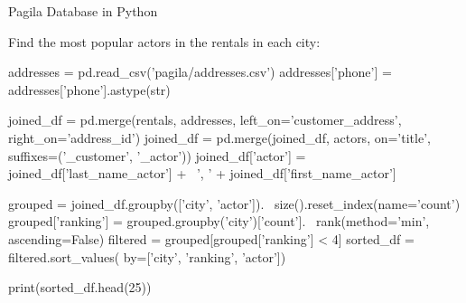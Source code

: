 \documentclass[ignorenonframetext,xcolor=x11names]{beamer}
\begin{document}
\begin{frame}[fragile]{Pagila Database in Python}

Find the most popular actors in the rentals in each city:

\scriptsize
\begin{pythoncode}
addresses = pd.read_csv('pagila/addresses.csv')
addresses['phone'] = addresses['phone'].astype(str)

joined_df = pd.merge(rentals, addresses, 
                     left_on='customer_address', 
                     right_on='address_id')
joined_df = pd.merge(joined_df, actors, 
                     on='title', 
                     suffixes=('_customer', '_actor'))
joined_df['actor'] = joined_df['last_name_actor'] + \
              ', ' + joined_df['first_name_actor']

grouped = joined_df.groupby(['city', 'actor']). \
            size().reset_index(name='count')
grouped['ranking'] = grouped.groupby('city')['count']. \
            rank(method='min', ascending=False)
filtered = grouped[grouped['ranking'] < 4]
sorted_df = filtered.sort_values(
               by=['city', 'ranking', 'actor'])

print(sorted_df.head(25))
\end{pythoncode}
\end{frame}
\end{document}
